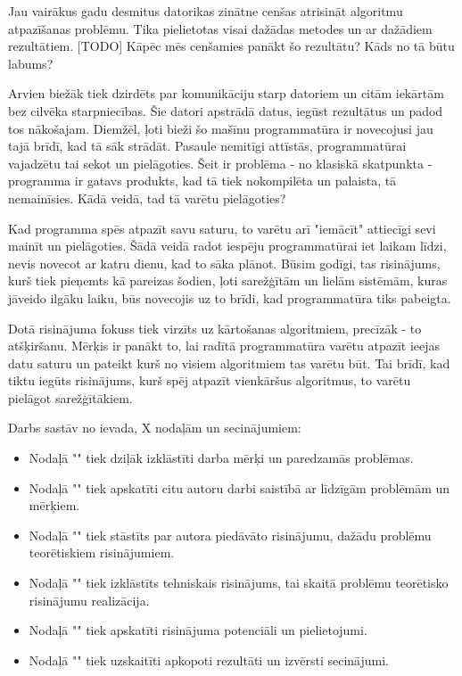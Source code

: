 Jau vairākus gadu desmitus datorikas zinātne cenšas atrisināt algoritmu atpazīšanas problēmu. Tika pielietotas visai dažādas metodes un ar dažādiem rezultātiem. [TODO] Kāpēc mēs cenšamies panākt šo rezultātu? Kāds no tā būtu labums? 

Arvien biežāk tiek dzirdēts par komunikāciju starp datoriem un citām iekārtām bez cilvēka starpniecības. Šie datori apstrādā datus, iegūst rezultātus un padod tos nākošajam. Diemžēl, ļoti bieži šo mašīnu programmatūra ir novecojusi jau tajā brīdī, kad tā sāk strādāt. Pasaule nemitīgi attīstās, programmatūrai vajadzētu tai sekot un pielāgoties. Šeit ir problēma - no klasiskā skatpunkta - programma ir gatavs produkts, kad tā tiek nokompilēta un palaista, tā nemainīsies. Kādā veidā, tad tā varētu pielāgoties?

Kad programma spēs atpazīt savu saturu, to varētu arī "iemācīt" attiecīgi sevi mainīt un pielāgoties. Šādā veidā radot iespēju programmatūrai iet laikam līdzi, nevis novecot ar katru dienu, kad to sāka plānot. Būsim godīgi, tas risinājums, kurš tiek pieņemts kā pareizas šodien, ļoti sarežģītām un lielām sistēmām, kuras jāveido ilgāku laiku, būs novecojis uz to brīdi, kad programmatūra tiks pabeigta. 

Dotā risinājuma fokuss tiek virzīts uz kārtošanas algoritmiem, precīzāk - to atšķiršanu. Mērķis ir panākt to, lai radītā programmatūra varētu atpazīt ieejas datu saturu un pateikt kurš no visiem algoritmiem tas varētu būt. Tai brīdī, kad tiktu iegūts risinājums, kurš spēj atpazīt vienkāršus algoritmus, to varētu pielāgot sarežģītākiem. 

Darbs sastāv no ievada, X nodaļām un secinājumiem:
\begin{itemize}
    \item Nodaļā "{\@nodone}" tiek dziļāk izklāstīti darba mērķi un paredzamās problēmas.
    \item Nodaļā "{\@nodtwo}" tiek apskatīti citu autoru darbi saistībā ar līdzīgām problēmām un mērķiem. 
    \item Nodaļā "{\@nodthree}" tiek stāstīts par autora piedāvāto risinājumu, dažādu problēmu teorētiskiem risinājumiem.
    \item Nodaļā "{\@nodfour}" tiek izklāstīts tehniskais risinājums, tai skaitā problēmu teorētisko risinājumu realizācija.
    \item Nodaļā "{\@nodfive}" tiek apskatīti risinājuma potenciāli un pielietojumi.
    \item Nodaļā "{\@nodsix}" tiek uzskaitīti apkopoti rezultāti un izvērsti secinājumi.
\end{itemize} 